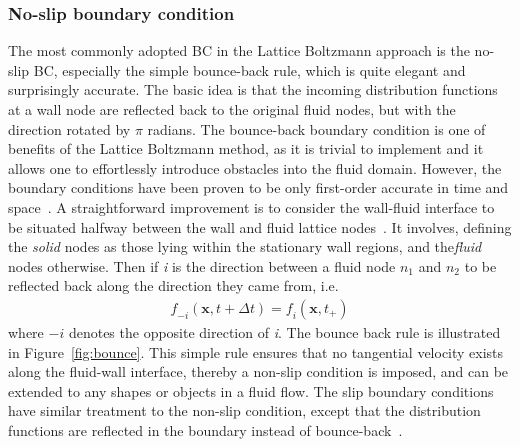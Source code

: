 \subsubsection*{No-slip boundary condition} \label{bounce}
The most commonly adopted BC in the Lattice Boltzmann approach is the no-slip BC, especially the simple bounce-back rule, which is quite elegant and surprisingly accurate. The basic idea is that the incoming distribution functions at a wall node are reflected back to the original fluid nodes, but with the direction rotated by $\pi$ radians. The bounce-back boundary condition is one of benefits of the Lattice Boltzmann method, as it is trivial to implement and it allows one to effortlessly introduce obstacles into the fluid domain. However, the boundary conditions have been proven to be only first-order accurate in time and space~\citep{pan2006}. A straightforward improvement is to consider the wall-fluid interface to be situated halfway between the wall and fluid lattice nodes~\citep{ziegler1993}. It involves, defining the \textit{solid} nodes as those lying within the stationary wall regions, and the\textit{fluid} nodes otherwise. Then if \textit{i} is the direction between a fluid node $\textit{n}_{1}$ and $\textit{n}_{2}$ to be reflected back along the direction they came from, i.e.
\begin{align}
\textit{f}_{-\textit{i}}(\textbf{x}, \textit{t}+\Delta \textit{t}) = \textit{f}_{\textit{i}}(\textbf{x}, \textit{t}_{+})
\end{align}
where $-\textit{i}$ denotes the opposite direction of \textit{i}. The bounce back rule is illustrated in Figure~\ref{fig:bounce}. This simple rule ensures that no tangential velocity exists along the fluid-wall interface, thereby a non-slip condition is imposed, and can be extended to any shapes or objects in a fluid flow. The slip boundary conditions have similar treatment to the non-slip condition, except that the distribution functions are reflected in the boundary instead of bounce-back~\citep{succi2001}.
